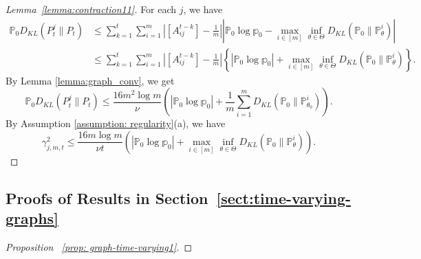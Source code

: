 \documentclass[twoside,11pt]{article}
\numberwithin{equation}{section}
\newcommand\bP{\mathbb{P}}
\newcommand\bp{\mathbb{p}}
\begin{document}
{\begin{proof}[Lemma~\ref{lemma:contraction11}]
For each $j$, we have
\begin{align*}
\bP_0 D_{KL}(P_t^j \parallel P_t) &\leq  \sum_{k = 1}^t \sum_{i = 1}^m | [A^{t - k}_{ij}] -  \frac{1}{m}| \left|\bP_0\log \bp_0 - \max_{i \in [m]}\inf_{\theta \in \Theta} D_{KL}(\bP_0 \parallel \bP_\theta^i) \right| \\
 & \leq  \sum_{k = 1}^t \sum_{i = 1}^m | [A^{t - k}_{ij}] -  \frac{1}{m}| \left\{|\bP_0\log \bp_0| + \max_{i \in [m]}\inf_{\theta \in \Theta} D_{KL}(\bP_0 \parallel \bP_\theta^i) \right\}. 
\end{align*}
By Lemma \ref{lemma:graph_conv}, we get
\begin{equation*}
\bP_0 D_{KL}(P_t^j \parallel P_t)  \leq \frac{16 m^2 \log m}{\nu} \left(|\bP_0\log \bp_0| + \frac{1}{m}\sum_{i = 1}^m D_{KL}(\bP_0 \parallel \bP_{\theta_0}^i)\right). 
\end{equation*}
By Assumption \ref{assumption: regularity}(a), we have
\begin{equation*}
    \gamma_{j,m,t}^2 \leq \frac{16m \log m}{\nu t} \left(|\bP_0\log \bp_0| +  \max_{i \in [m]}\inf_{\theta \in \Theta} D_{KL}(\bP_0 \parallel \bP_\theta^i) \right). 
\end{equation*}
\end{proof}


\subsection{Proofs of Results in Section~\ref{sect:time-varying-graphs}} \label{app:time-varying-graphs}
\begin{proof} [Proposition ~\ref{prop: graph-time-varying1}]


\end{proof}}
\end{document}
